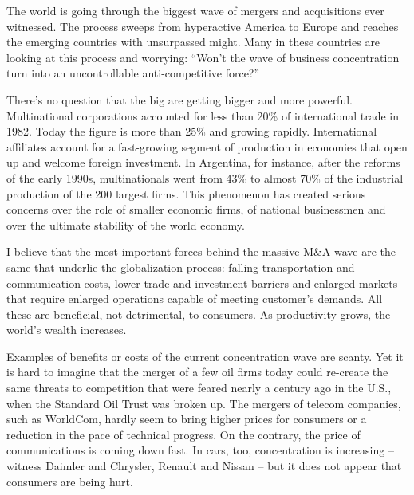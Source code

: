 \documentclass[a4paper]{article}
\begin{document}
\par
The world is going through the biggest wave of mergers and acquisitions ever witnessed. The process sweeps from hyperactive America to Europe and reaches the emerging countries with unsurpassed might. Many in these countries are looking at this process and worrying: “Won’t the wave of business concentration turn into an uncontrollable anti-competitive force?”

\par
There’s no question that the big are getting bigger and more powerful. Multinational corporations accounted for less than 20\% of international trade in 1982. Today the figure is more than 25\% and growing rapidly. International affiliates account for a fast-growing segment of production in economies that open up and welcome foreign investment. In Argentina, for instance, after the reforms of the early 1990s, multinationals went from 43\% to almost 70\% of the industrial production of the 200 largest firms. This phenomenon has created serious concerns over the role of smaller economic firms, of national businessmen and over the ultimate stability of the world economy.

\par
I believe that the most important forces behind the massive M\&A wave are the same that underlie the globalization process: falling transportation and communication costs, lower trade and investment barriers and enlarged markets that require enlarged operations capable of meeting customer’s demands. All these are beneficial, not detrimental, to consumers. As productivity grows, the world’s wealth increases.

\par
Examples of benefits or costs of the current concentration wave are scanty. Yet it is hard to imagine that the merger of a few oil firms today could re-create the same threats to competition that were feared nearly a century ago in the U.S., when the Standard Oil Trust was broken up. The mergers of telecom companies, such as WorldCom, hardly seem to bring higher prices for consumers or a reduction in the pace of technical progress. On the contrary, the price of communications is coming down fast. In cars, too, concentration is increasing -- witness Daimler and Chrysler, Renault and Nissan -- but it does not appear that consumers are being hurt.
\end{document}
